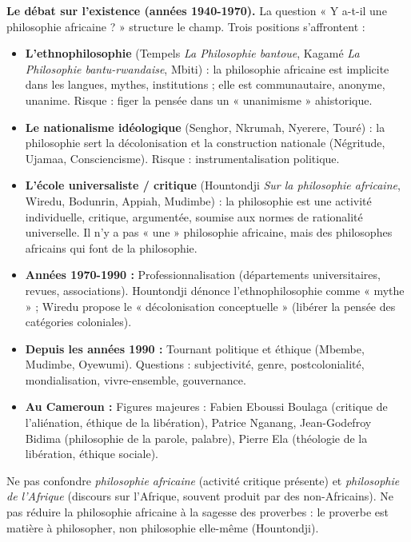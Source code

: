 \documentclass[11pt]{article}
\newcommand{\cle}[1]{{\popxbold\color{popdark}#1}}
\begin{document}
\textbf{Le débat sur l'existence (années 1940-1970).} La question « Y a-t-il une philosophie africaine ? » structure le champ. Trois positions s'affrontent :
\begin{itemize}
\item \textbf{L'ethnophilosophie} (Tempels \emph{La Philosophie bantoue}, Kagamé \emph{La Philosophie bantu-rwandaise}, Mbiti) : la philosophie africaine est implicite dans les langues, mythes, institutions ; elle est communautaire, anonyme, unanime. Risque : figer la pensée dans un « unanimisme » ahistorique.
\item \textbf{Le nationalisme idéologique} (Senghor, Nkrumah, Nyerere, Touré) : la philosophie sert la décolonisation et la construction nationale (Négritude, Ujamaa, Consciencisme). Risque : instrumentalisation politique.
\item \textbf{L'école universaliste / critique} (Hountondji \emph{Sur la philosophie africaine}, Wiredu, Bodunrin, Appiah, Mudimbe) : la philosophie est une activité individuelle, critique, argumentée, soumise aux normes de rationalité universelle. Il n'y a pas « une » philosophie africaine, mais des philosophes africains qui font de la philosophie.
\end{itemize}

\begin{aretenir}
\begin{itemize}
\item \textbf{Années 1970-1990 :} Professionnalisation (départements universitaires, revues, associations). Hountondji dénonce l'ethnophilosophie comme « mythe » ; Wiredu propose le « décolonisation conceptuelle » (libérer la pensée des catégories coloniales).
\item \textbf{Depuis les années 1990 :} Tournant politique et éthique (Mbembe, Mudimbe, Oyewumi). Questions : subjectivité, genre, postcolonialité, mondialisation, \cle{vivre-ensemble}, \cle{gouvernance}.
\item \textbf{Au Cameroun :} Figures majeures : Fabien Eboussi Boulaga (critique de l'aliénation, éthique de la libération), Patrice Nganang, Jean-Godefroy Bidima (philosophie de la parole, palabre), Pierre Ela (théologie de la libération, éthique sociale).
\end{itemize}
\end{aretenir}

\begin{attention}
Ne pas confondre \emph{philosophie africaine} (activité critique présente) et \emph{philosophie de l'Afrique} (discours sur l'Afrique, souvent produit par des non-Africains). Ne pas réduire la philosophie africaine à la sagesse des proverbes : le proverbe est matière à philosopher, non philosophie elle-même (Hountondji).
\end{attention}
\end{document}
